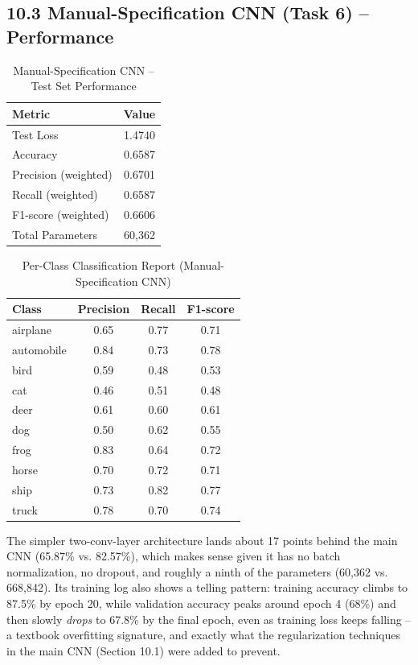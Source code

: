 \documentclass[11pt]{article}
\begin{document}
\subsection*{10.3 Manual-Specification CNN (Task 6) -- Performance}

\begin{table}[H]
\centering
\caption{Manual-Specification CNN -- Test Set Performance}
\begin{tabular}{lc}
\toprule
Metric & Value \\
\midrule
Test Loss & 1.4740 \\
Accuracy & 0.6587 \\
Precision (weighted) & 0.6701 \\
Recall (weighted) & 0.6587 \\
F1-score (weighted) & 0.6606 \\
Total Parameters & 60,362 \\
\bottomrule
\end{tabular}
\end{table}

\begin{table}[H]
\centering
\caption{Per-Class Classification Report (Manual-Specification CNN)}
\begin{tabular}{lccc}
\toprule
Class & Precision & Recall & F1-score \\
\midrule
airplane   & 0.65 & 0.77 & 0.71 \\
automobile & 0.84 & 0.73 & 0.78 \\
bird       & 0.59 & 0.48 & 0.53 \\
cat        & 0.46 & 0.51 & 0.48 \\
deer       & 0.61 & 0.60 & 0.61 \\
dog        & 0.50 & 0.62 & 0.55 \\
frog       & 0.83 & 0.64 & 0.72 \\
horse      & 0.70 & 0.72 & 0.71 \\
ship       & 0.73 & 0.82 & 0.77 \\
truck      & 0.78 & 0.70 & 0.74 \\
\bottomrule
\end{tabular}
\end{table}

The simpler two-conv-layer architecture lands about 17 points behind the main CNN (65.87\% vs. 82.57\%), which makes sense given it has no batch normalization, no dropout, and roughly a ninth of the parameters (60,362 vs. 668,842). Its training log also shows a telling pattern: training accuracy climbs to 87.5\% by epoch 20, while validation accuracy peaks around epoch 4 (68\%) and then slowly \textit{drops} to 67.8\% by the final epoch, even as training loss keeps falling -- a textbook overfitting signature, and exactly what the regularization techniques in the main CNN (Section 10.1) were added to prevent.
\end{document}
